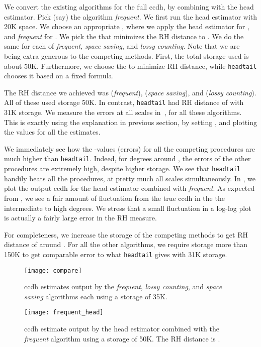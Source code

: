 \documentclass[11pt]{article}
\theoremstyle{definition}
\newcommand{\degdist}{{\tt headtail}}
\begin{document}
We convert the existing algorithms for the full ccdh, by combining with the head estimator.
Pick (say) the algorithm \emph{frequent}.
We first run the head estimator with 20K space. We choose an appropriate , where we apply the head
estimator for , and \emph{frequent} for .
We pick the  that minimizes the RH distance to .
We do the same for each of \emph{frequent}, \emph{space saving}, and \emph{lossy counting}.
Note that we are being extra generous to the competing methods. First, the total
storage used is about 50K. Furthermore, we choose the  to minimize RH distance,
while \degdist{} chooses it based on a fixed formula.

The RH distance we achieved was  (\emph{frequent}),  (\emph{space saving}), and  (\emph{lossy counting}).
All of these used storage 50K. In contrast, \degdist{} had RH distance of  with 31K storage.
We measure the errors at all scales in~, for all these algorithms. This is exactly
using the explanation in previous section, by setting , and plotting the 
values for all the estimates.

We immediately see how the -values (errors) for all the competing procedures are much higher than \degdist.
Indeed, for degrees around , the errors of the other procedures are extremely high, despite higher storage.
We see that \degdist{} handily beats all the procedures, at pretty much all scales simultaneously.
In , we plot the output ccdh for the head estimator combined with \emph{frequent}.
As expected from , we see a fair amount of fluctuation from the true ccdh in the the intermediate
to high degrees. We stress that a small fluctuation in a log-log plot is actually a fairly large error
in the RH measure.

For completeness, we increase the storage of the competing methods to get RH distance of around .
For all the other algorithms, we require storage more than 150K to get comparable
error to what \degdist{} gives with 31K storage.


\begin{figure*}
\centering
  \begin{minipage}[b]{0.5\linewidth}
    \centering
    \texttt{[image: compare]}
    \captionsetup{width=0.9\textwidth}
    \caption{ccdh estimates output by the \emph{frequent}, \emph{lossy counting},
and \emph{space saving} algorithms each using a storage of 35K.\\}
    \label{fig:compare}
\end{minipage}\begin{minipage}[b]{0.5\linewidth}
    \centering
    \texttt{[image: frequent\_head]}
    \captionsetup{width=0.9\textwidth}
    \caption{ccdh estimate output by the head estimator combined with the
\emph{frequent} algorithm using a storage of 50K.  The RH distance
is .}
    \label{fig:frequent_head}
\end{minipage}
\end{figure*}
\end{document}
